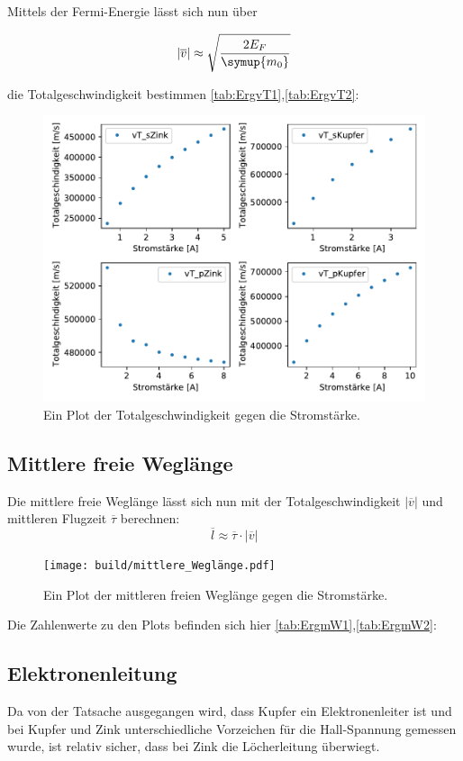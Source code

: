     Mittels der Fermi-Energie lässt sich nun über 

    \begin{equation}
        |\overline{v}| \approx \sqrt{\frac{2E_F}{\symup{m_0}}} \nonumber
    \end{equation}

    die Totalgeschwindigkeit bestimmen \ref{tab:ErgvT1},\ref{tab:ErgvT2}: 

    \begin{figure}[H]
        \centering
        \includegraphics[width=1.1\textwidth]{build/Totalgeschwindigkeit.pdf}
        \caption{Ein Plot der Totalgeschwindigkeit gegen die Stromstärke.}
        \label{img:vT}
    \end{figure}


    \subsection{Mittlere freie Weglänge}


    Die mittlere freie Weglänge lässt sich nun mit der Totalgeschwindigkeit $|\overline{v}|$ und mittleren Flugzeit $\overline{\tau}$ berechnen:
    \begin{equation}
        \overline{l} \approx \overline{\tau} \cdot |\overline{v}| \nonumber
    \end{equation}

    
    \begin{figure}[H]
        \centering
        \texttt{[image: build/mittlere\_Weglänge.pdf]}
        \caption{Ein Plot der mittleren freien Weglänge gegen die Stromstärke.}
        \label{img:mfl}
    \end{figure}
    \noindent
    Die Zahlenwerte zu den Plots befinden sich hier \ref{tab:ErgmW1},\ref{tab:ErgmW2}:

    \subsection{Elektronenleitung}
    Da von der Tatsache ausgegangen wird, dass Kupfer ein Elektronenleiter ist und bei Kupfer und Zink unterschiedliche Vorzeichen für
    die Hall-Spannung gemessen wurde, ist relativ sicher, dass bei Zink die Löcherleitung überwiegt.